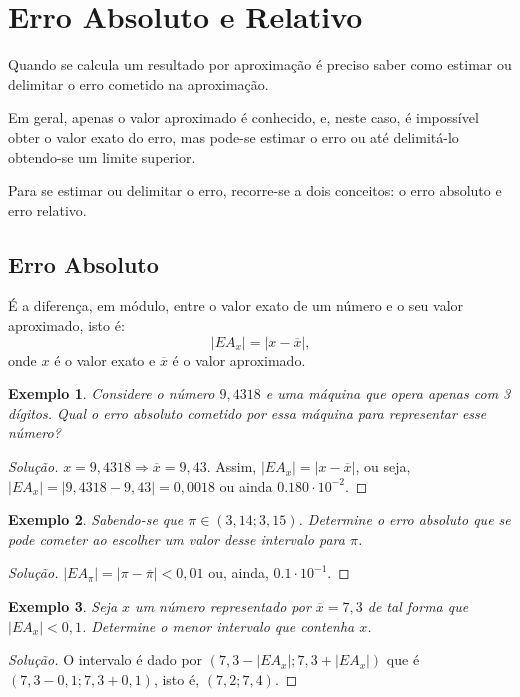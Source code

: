 \documentclass[
	12pt,				%
	openright,			%
	twoside,			%
	a4paper,			%
	english,			%
	french,				%
	brazil,				%
	sumario=tradicional
]{abntex2}
\newtheorem{example}{Exemplo}
\newenvironment{solution}{
	\begin{proof}[Solução]
}{\end{proof}}
\numberwithin{example}{chapter}
\numberwithin{remark}{chapter}
\numberwithin{definition}{chapter}
\numberwithin{figure}{chapter}
\begin{document}
\section{Erro Absoluto e Relativo}

Quando se calcula um resultado por aproximação é preciso saber como estimar ou delimitar o erro cometido na aproximação. 

Em geral, apenas o valor aproximado é conhecido, e, neste caso, é impossível obter o valor exato do erro, mas pode-se estimar o erro ou até delimitá-lo obtendo-se um limite superior.

Para se estimar ou delimitar o erro, recorre-se a dois conceitos: o erro absoluto e erro relativo.

\subsection{Erro Absoluto}

É a diferença, em módulo, entre o valor exato de um número e o seu valor aproximado, isto é:
$$
    |EA_x|=|x-\overline{x}|
    \text{,}
$$
onde $x$ é o valor exato e $\overline{x}$ é o valor aproximado.

\begin{example}
    Considere o número $9,4318$ e uma máquina que opera apenas com 3 dígitos. Qual o erro absoluto cometido por essa máquina para representar esse número?
\end{example}
\begin{solution}
    $x=9,4318 \Longrightarrow \overline{x}=9,43$. Assim, $|EA_x|=|x-\overline{x}|$, ou seja, $|EA_x|=|9,4318-9,43|=0,0018$ ou ainda $0.180\cdot 10^{-2}$.
\end{solution}

\begin{example}
    Sabendo-se que $\pi \in (3,14; 3,15)$. Determine o erro absoluto que se pode cometer ao escolher um valor desse intervalo para $\pi$.
\end{example}
\begin{solution}
    $|EA_{\pi}|=|\pi-\overline{\pi}|<0,01$ ou, ainda, $0.1\cdot 10^{-1}$.
\end{solution}

\begin{example}
    Seja $x$ um número representado por $\overline{x}=7,3$ de tal forma que $|EA_x|<0,1$. Determine o menor intervalo que contenha $x$.
\end{example}
\begin{solution}
    O intervalo é dado por $(7,3-|EA_x|;7,3+|EA_x|)$ que é $(7,3-0,1;7,3+0,1)$, isto é, $(7,2;7,4)$.
\end{solution}
\end{document}
